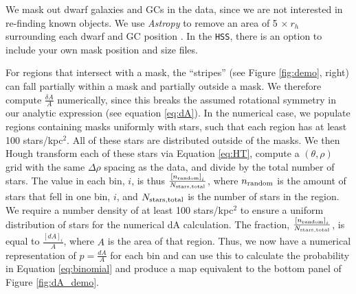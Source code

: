 \documentclass[twocolumn]{aastex631}
\begin{document}
We mask out dwarf galaxies and GCs in the data, since we are not interested in re-finding known objects. We use {\it Astropy} \citep{astropy13, astropy18} to remove an area of 5 $\times~ r_h$ surrounding each dwarf and GC position \citep[][]{huxor14,martin17,McConnachie19}. In the \texttt{HSS}, there is an option to include your own mask position and size files. 

For regions that intersect with a mask, the ``stripes'' (see Figure \ref{fig:demo}, right) can fall partially within a mask and partially outside a mask. We therefore compute $\frac{\delta A}{A}$ numerically, since this breaks the assumed rotational symmetry in our analytic expression (see equation \ref{eq:dA}). In the numerical case, we populate regions containing masks uniformly with stars, such that each region has at least 100 stars/kpc$^2$. All of these stars are distributed outside of the masks. We then Hough transform each of these stars via Equation \ref{eq:HT}, compute a $(\theta,\rho)$ grid with the same $\Delta \rho$ spacing as the data, and divide by the total number of stars. The value in each bin, $i$, is thus $\frac{\left[n_{\rm random}\right]_i}{N_{\rm stars, total}}$, where $n_{\rm random}$ is the amount of stars that fell in one bin, $i$, and $N_{\rm stars, total}$ is the number of stars in the region. We require a number density of at least 100 stars/kpc$^2$ to ensure a uniform distribution of stars for the numerical dA calculation. The fraction, $\frac{\left[n_{\rm random}\right]_i}{N_{\rm stars, total}}$, is equal to $\frac{\left[dA\right]_i}{A}$, where $A$ is the area of that region. Thus, we now have a numerical representation of $p = \frac{dA}{A}$ for each bin and can use this to calculate the probability in Equation \ref{eq:binomial} and produce a map equivalent to the bottom panel of Figure \ref{fig:dA_demo}. 
\end{document}
